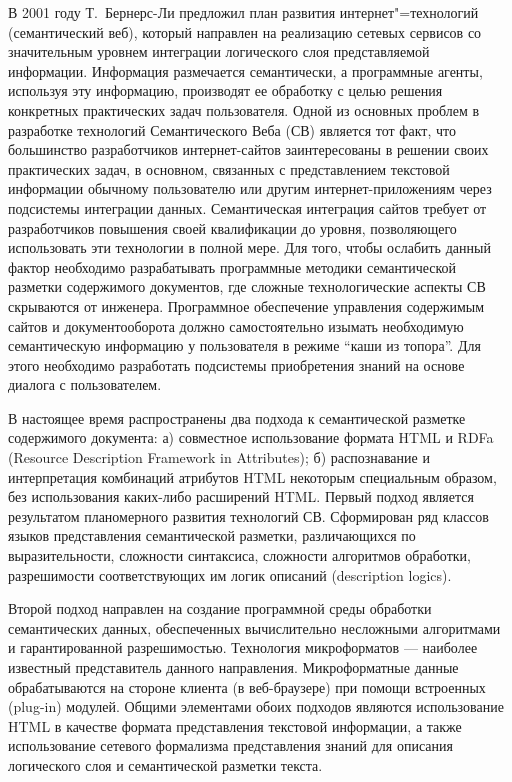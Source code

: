 \documentclass[utf8]{../IncArticle}
\begin{document}
\introduction{}

В 2001 году Т.~Бернерс-Ли предложил план \cite{TBL2001} развития
интернет"=технологий (семантический веб), который направлен на
реализацию сетевых сервисов со значительным уровнем интеграции
логического слоя представляемой информации.  Информация размечается
семантически, а программные агенты, используя эту информацию,
производят ее обработку с целью решения конкретных практических задач
пользователя. Одной из основных проблем в разработке технологий
Семантического Веба (СВ) является тот факт, что большинство
разработчиков интернет-сайтов заинтересованы в решении своих
практических задач, в основном, связанных с представлением текстовой
информации обычному пользователю или другим интернет-приложениям через
подсистемы интеграции данных.  Семантическая интеграция сайтов требует
от разработчиков повышения своей квалификации до уровня, позволяющего
использовать эти технологии в полной мере.  Для того, чтобы ослабить
данный фактор необходимо разрабатывать программные методики
семантической разметки содержимого документов, где сложные
технологические аспекты СВ скрываются от инженера.  Программное
обеспечение управления содержимым сайтов и документооборота должно
самостоятельно изымать необходимую семантическую информацию у
пользователя в режиме ``каши из топора''.  Для этого необходимо
разработать подсистемы приобретения знаний на основе диалога с
пользователем.

В настоящее время распространены два подхода к семантической разметке
содержимого документа: а) совместное использование формата HTML и RDFa
(Resource Description Framework in Attributes); б) распознавание и
интерпретация комбинаций атрибутов HTML некоторым специальным образом,
без использования каких-либо расширений HTML.  Первый подход является
результатом планомерного развития технологий СВ.  Сформирован ряд
классов языков представления семантической разметки, различающихся по
выразительности, сложности синтаксиса, сложности алгоритмов обработки,
разрешимости соответствующих им логик описаний (description logics).

Второй подход направлен на создание программной среды обработки
семантических данных, обеспеченных вычислительно несложными
алгоритмами и гарантированной разрешимостью.  Технология микроформатов
\cite{b2:2} --- наиболее известный представитель данного направления.
Микроформатные данные обрабатываются на стороне клиента (в
веб-браузере) при помощи встроенных (plug-in) модулей.  Общими
элементами обоих подходов являются использование HTML в качестве
формата представления текстовой информации, а также использование
сетевого формализма представления знаний для описания логического слоя
и семантической разметки текста.
\end{document}
